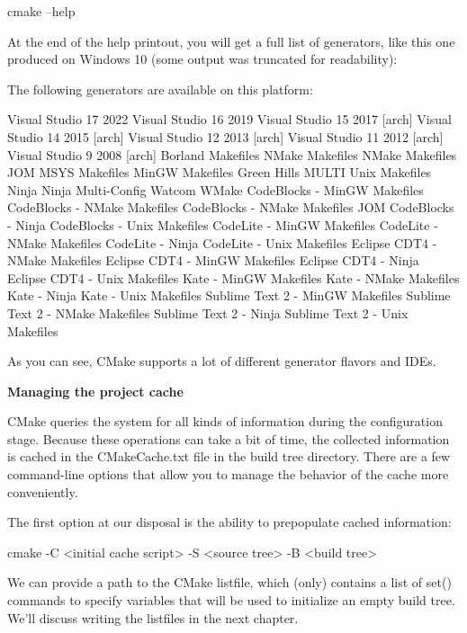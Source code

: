 \begin{shell}
cmake --help
\end{shell}

At the end of the help printout, you will get a full list of generators, like this one produced on Windows 10 (some output was truncated for readability):

 The following generators are available on this platform:

\begin{shell}
Visual Studio 17 2022
Visual Studio 16 2019
Visual Studio 15 2017 [arch]
Visual Studio 14 2015 [arch]
Visual Studio 12 2013 [arch]
Visual Studio 11 2012 [arch]
Visual Studio 9 2008 [arch]
Borland Makefiles
NMake Makefiles
NMake Makefiles JOM
MSYS Makefiles
MinGW Makefiles
Green Hills MULTI
Unix Makefiles
Ninja
Ninja Multi-Config
Watcom WMake
CodeBlocks - MinGW Makefiles
CodeBlocks - NMake Makefiles
CodeBlocks - NMake Makefiles JOM
CodeBlocks - Ninja
CodeBlocks - Unix Makefiles
CodeLite - MinGW Makefiles
CodeLite - NMake Makefiles
CodeLite - Ninja
CodeLite - Unix Makefiles
Eclipse CDT4 - NMake Makefiles
Eclipse CDT4 - MinGW Makefiles
Eclipse CDT4 - Ninja
Eclipse CDT4 - Unix Makefiles
Kate - MinGW Makefiles
Kate - NMake Makefiles
Kate - Ninja
Kate - Unix Makefiles
Sublime Text 2 - MinGW Makefiles
Sublime Text 2 - NMake Makefiles
Sublime Text 2 - Ninja
Sublime Text 2 - Unix Makefiles
\end{shell}

As you can see, CMake supports a lot of different generator flavors and IDEs.

\noindent
\textbf{Managing the project cache}

CMake queries the system for all kinds of information during the configuration stage. Because these operations can take a bit of time, the collected information is cached in the CMakeCache.txt file in the build tree directory. There are a few command-line options that allow you to manage the behavior of the cache more conveniently.

The first option at our disposal is the ability to prepopulate cached information:

\begin{shell}
cmake -C <initial cache script> -S <source tree> -B <build tree>
\end{shell}

We can provide a path to the CMake listfile, which (only) contains a list of set() commands to specify variables that will be used to initialize an empty build tree. We’ll discuss writing the listfiles in the next chapter.

